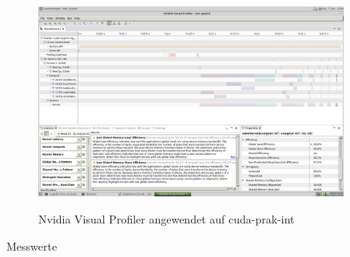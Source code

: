 \documentclass[12pt,a4paper]{scrartcl}
\begin{document}
\begin{figure}[h]
    \caption{Nvidia Visual Profiler angewendet auf cuda-prak-int}
    \includegraphics[width=0.9\textwidth]{Sobel_Int_Efficiency.png}
    \label{fig:sobelint}
\end{figure}

\begin{table}[h]
    \caption{Messwerte}
    \label{tab:messwerte}
\end{table}
\end{document}
